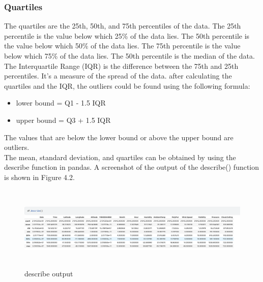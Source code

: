 \documentclass{report}
\begin{document}
\subsubsection{Quartiles}
The quartiles are the 25th, 50th, and 75th percentiles of the data. The 25th percentile is the value below which 25\% of the data lies. The 50th percentile is the value below which 50\% of the data lies. The 75th percentile is the value below which 75\% of the data lies. The 50th percentile is the median of the data. \hfill \break 
The Interquartile Range (IQR) is the difference between the 75th and 25th percentiles. It's a measure of the spread of the data. after calculating the quartiles and the IQR, the outliers could be found using the following formula:
\begin{itemize}
    \item lower bound = Q1 - 1.5 \times IQR
    \item upper bound = Q3 + 1.5 \times IQR
\end{itemize}
The values that are below the lower bound or above the upper bound are outliers.\hfill \break 
\\
The mean, standard deviation, and quartiles can be obtained by using the describe function in pandas. A screenshot of the output of the describe() function is shown in Figure 4.2.
\begin{figure}[h!]
  \centering
    \includegraphics[width=14cm, height=4cm] {describe.png}
    \caption{describe output}
    \label{fig:my_label}
\end{figure}\hfill \break 
\\
\end{document}
